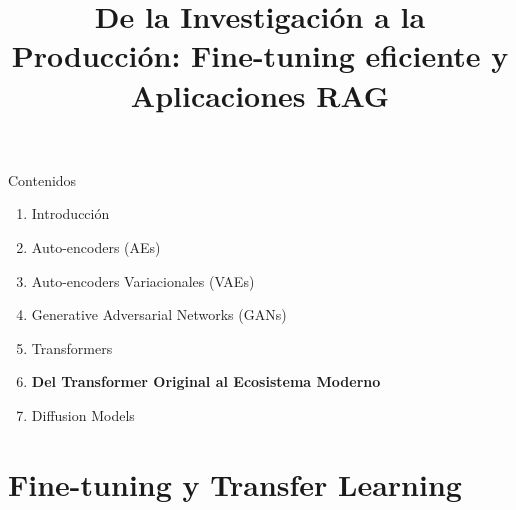 



\newcommand{\mytitle}{De la Investigación a la Producción: Fine-tuning eficiente y Aplicaciones RAG}
\title{\mytitle}


\maketitle

\begin{frame}{Contenidos}
  \begin{enumerate}
      \item Introducción
      \item Auto-encoders (AEs)
      \item{Auto-encoders Variacionales (VAEs)}
      \item{Generative Adversarial Networks (GANs)}
      \item{Transformers}
      \item{\textbf{Del Transformer Original al Ecosistema Moderno}}
      \item{Diffusion Models}
    \end{enumerate}
\end{frame}

\section{Fine-tuning y Transfer Learning}


